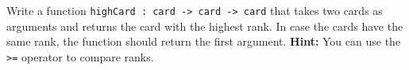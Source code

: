 Write a function \lstinline{highCard : card -> card -> card} that
takes two cards as arguments and returns the card with the highest
rank.  In case the cards have the same rank, the function should
return the first argument. \textbf{Hint:} You can use the
\lstinline{>=} operator to compare ranks.

